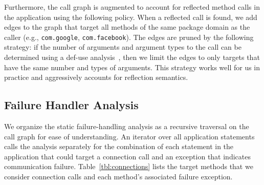 Furthermore, the call graph is augmented to account for reflected
method calls in the application using the following policy.  When a
reflected call is found, we add edges to the graph that target all
methods of the same package domain as the caller (e.g.,
\lstinline!com.google!, \lstinline!com.facebook!).  The edges are pruned by the
following strategy: if the number of arguments and argument types to
the call can be determined using a def-use analysis~\cite{Aho2006},
then we limit the edges to only targets that have the same number and
types of arguments.  This strategy works well for us in
practice and aggressively accounts for reflection semantics.

\subsection{Failure Handler Analysis}
We organize the static failure-handling analysis as a recursive
traversal on the call graph for ease of understanding.  An iterator
over all application statements calls the analysis separately for the
combination of each statement in the application that could target a
connection call and an exception that indicates communication failure.
Table~\ref{tbl:connections} lists the target methods that we consider
connection calls and each method's associated failure exception.

